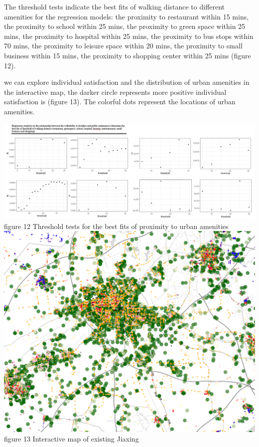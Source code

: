 \documentclass[
]{article}
\begin{document}
The threshold tests indicate the best fits of walking distance to
different amenities for the regression models: the proximity to
restaurant within 15 mins, the proximity to school within 25 mins, the
proximity to green space within 25 mins, the proximity to hospital
within 25 mins, the proximity to bus stops within 70 mins, the proximity
to leisure space within 20 mins, the proximity to small business within
15 mins, the proximity to shopping center within 25 mins (figure 12).

we can explore individual satisfaction and the distribution of urban
amenities in the interactive map, the darker circle represents more
positive individual satisfaction is (figure 13). The colorful dots
represent the locations of urban amenities.

\href{https://WTHSYZW.github.io/Thesis_2022/maps/bestfit.png}{\includegraphics{maps/bestfit.png}}
figure 12 Threshold tests for the best fits of proximity to urban
amenities
\href{https://WTHSYZW.github.io/Thesis_2022/jx_ex.html}{\includegraphics{maps/jx_ex.png}}
figure 13 Interactive map of existing Jiaxing
\end{document}
